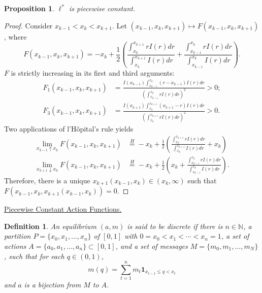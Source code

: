 \documentclass[12pt]{article}
\newtheorem{definition}{Definition}
\newtheorem{proposition}{Proposition}
\begin{document}
\begin{proposition}
$\ell^{*}$ is piecewise constant.
\end{proposition}
\begin{proof}
Consider $x_{k-1}<x_{k}<x_{k+1}$. Let $(x_{k-1},x_{k},x_{k+1})\mapsto F(x_{k-1},x_{k},x_{k+1})$, where
\begin{equation}
F(x_{k-1},x_{k},x_{k+1})=-x_{k}+\frac{1}{2}\left(\frac{\int_{x_{k}}^{x_{k+1}}{rI(r)dr}}{\int_{x_{k}}^{x_{k+1}}{I(r)dr}}+\frac{\int_{x_{k-1}}^{x_{k}}{rI(r)dr}}{\int_{x_{k-1}}^{x_{k}}{I(r)dr}}\right).
\end{equation}
$F$ is strictly increasing in its first and third arguments:
\begin{align}
F_{1}(x_{k-1},x_{k},x_{k+1})&=\frac{I(x_{k-1})\int_{x_{k-1}}^{x_{k}}{(r-x_{k-1})I(r)dr}}{\left(\int_{x_{k-1}}^{x_{k}}{rI(r)dr}\right)^{2}}>0;\\
F_{3}(x_{k-1},x_{k},x_{k+1})&=\frac{I(x_{k+1})\int_{x_{k}}^{x_{k+1}}{(x_{k+1}-r)I(r)dr}}{\left(\int_{x_{k}}^{x_{k+1}}{rI(r)dr}\right)^{2}}>0.
\end{align}
Two applications of l'H\^{o}pital's rule yields
\begin{align}
\lim_{x_{k-1}\uparrow x_{k}}F(x_{k-1},x_{k},x_{k+1})&\overset{H}{=}-x_{k}+\frac{1}{2}\left(\frac{\int_{x_{k}}^{x_{k+1}}{rI(r)dr}}{\int_{x_{k}}^{x_{k+1}}{I(r)dr}}+x_{k}\right)\\
\lim_{x_{k+1}\downarrow x_{k}}F(x_{k-1},x_{k},x_{k+1})&\overset{H}{=}-x_{k}+\frac{1}{2}\left(x_{k}+\frac{\int_{x_{k-1}}^{x_{k}}{rI(r)dr}}{\int_{x_{k-1}}^{x_{k}}{I(r)dr}}\right).
\end{align}
Therefore, there is a unique $x_{k+1}(x_{k-1},x_{k})\in(x_{k},\infty)$ such that $F(x_{k-1},x_{k},x_{k+1}(x_{k-1},x_{k}))=0$.
\end{proof}

\noindent\underline{Piecewise Constant Action Functions.}

\begin{definition}
An equilibrium $(a,m)$ is said to be discrete if there is $n\in\mathbb{N}$, a partition $P=\{x_{0},x_{1},\ldots,x_{n}\}$ of $[0,1]$ with $0=x_{0}<x_{1}<\cdots<x_{n}=1$, a set of actions $A=\{a_{0},a_{1},\ldots,a_{n}\}\subset[0,1]$, and a set of messages $M=\{m_{0},m_{1},\ldots,m_{N}\}$, such that for each $q\in(0,1)$,
\begin{equation*}
m(q)=\sum_{t=1}^{n}m_{t}\mathbf{1}_{x_{t-1}\leq q<x_{t}}
\end{equation*}
and $a$ is a bijection from $M$ to $A$.
\end{definition}
\end{document}
